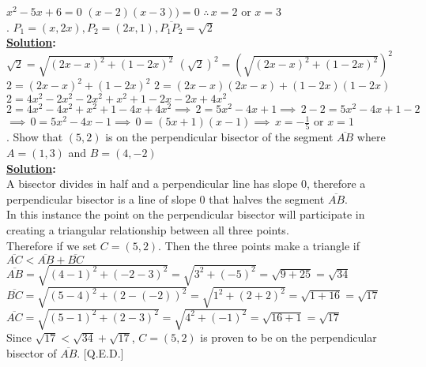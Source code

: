 \documentclass[10pt,letterpaper]{article}
\begin{document}
\newline$x^2-5x+6=0$
\newline$(x-2)(x-3))=0$
\newline$\therefore\,x=2$ or $x=3$\\
. $P_{1} = (x, 2x), P_{2} = (2x, 1), \overline{P_1P_2} = \sqrt{2}$\\
\textbf{\underline {Solution}:}\\
\newline$\sqrt{2}=\sqrt{(2x-x)^2+(1-2x)^2}$
\newline$(\sqrt{2})^2=(\sqrt{(2x-x)^2+(1-2x)^2})^2$
\newline$2=(2x-x)^2+(1-2x)^2$
\newline$2=(2x-x)(2x-x)+(1-2x)(1-2x)$
\newline$2=4x^2-2x^2-2x^2+x^2+1-2x-2x+4x^2$
\newline$2=4x^2-4x^2+x^2+1-4x+4x^2 \implies\, 2=5x^2-4x+1 \implies\, 2-2=5x^2-4x+1-2$
\newline$\implies\, 0=5x^2-4x-1 \implies\, 0=(5x+1)(x-1) \implies\, x=-\frac{1}{5}$ or $x=1$\\
. Show that $(5,2)$ is on the perpendicular bisector of the segment $\overline{AB}$ where $A = (1,3)$ and $B=(4, -2)$\\
\textbf{\underline {Solution}:}\\
\newline A bisector divides in half and a perpendicular line has slope 0, therefore a perpendicular bisector is a line of slope 0 that halves the segment $\overline{AB}$.\\
\newline In this instance the point on the perpendicular bisector will participate in creating a triangular relationship between all three points.\\
\newline Therefore if we set $C=(5,2)$. Then the three points make a triangle if $\overline{AC} <\overline{AB}+\overline{BC}$\\
\newline$\overline{AB}=\sqrt{(4-1)^2+(-2-3)^2}=\sqrt{3^2+(-5)^2}=\sqrt{9+25}=\sqrt{34}$
\newline$\overline{BC}=\sqrt{(5-4)^2+(2-(-2))^2}=\sqrt{1^2+(2+2)^2}=\sqrt{1+16}=\sqrt{17}$
\newline$\overline{AC}=\sqrt{(5-1)^2+(2-3)^2}=\sqrt{4^2+(-1)^2}=\sqrt{16+1}=\sqrt{17}$\\
\newline Since $\sqrt{17} < \sqrt{34}+\sqrt{17}$, $C=(5,2)$ is proven to be on the perpendicular bisector of $\overline{AB}$. [Q.E.D.]
\end{document}
